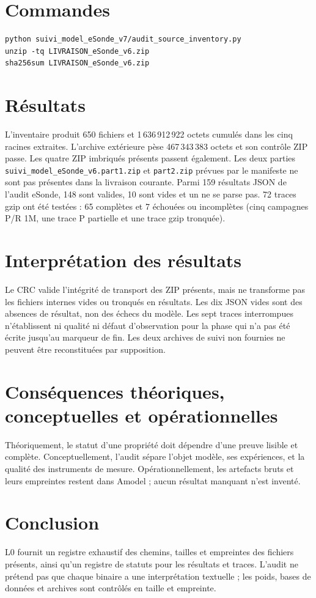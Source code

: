 \documentclass[11pt,a4paper]{report}
\begin{document}
\section{Commandes}
\begin{verbatim}
python suivi_model_eSonde_v7/audit_source_inventory.py
unzip -tq LIVRAISON_eSonde_v6.zip
sha256sum LIVRAISON_eSonde_v6.zip
\end{verbatim}
\section{Résultats}
L'inventaire produit 650 fichiers et 1\,636\,912\,922 octets cumulés dans les cinq racines extraites. L'archive extérieure pèse 467\,343\,383 octets et son contrôle ZIP passe. Les quatre ZIP imbriqués présents passent également. Les deux parties \texttt{suivi\_model\_eSonde\_v6.part1.zip} et \texttt{part2.zip} prévues par le manifeste ne sont pas présentes dans la livraison courante. Parmi 159 résultats JSON de l'audit eSonde, 148 sont valides, 10 sont vides et un ne se parse pas. 72 traces gzip ont été testées : 65 complètes et 7 échouées ou incomplètes (cinq campagnes P/R 1M, une trace P partielle et une trace gzip tronquée).
\section{Interprétation des résultats}
Le CRC valide l'intégrité de transport des ZIP présents, mais ne transforme pas les fichiers internes vides ou tronqués en résultats. Les dix JSON vides sont des absences de résultat, non des échecs du modèle. Les sept traces interrompues n'établissent ni qualité ni défaut d'observation pour la phase qui n'a pas été écrite jusqu'au marqueur de fin. Les deux archives de suivi non fournies ne peuvent être reconstituées par supposition.
\section{Conséquences théoriques, conceptuelles et opérationnelles}
Théoriquement, le statut d'une propriété doit dépendre d'une preuve lisible et complète. Conceptuellement, l'audit sépare l'objet modèle, ses expériences, et la qualité des instruments de mesure. Opérationnellement, les artefacts bruts et leurs empreintes restent dans Amodel ; aucun résultat manquant n'est inventé.
\section{Conclusion}
L0 fournit un registre exhaustif des chemins, tailles et empreintes des fichiers présents, ainsi qu'un registre de statuts pour les résultats et traces. L'audit ne prétend pas que chaque binaire a une interprétation textuelle ; les poids, bases de données et archives sont contrôlés en taille et empreinte.
\end{document}
